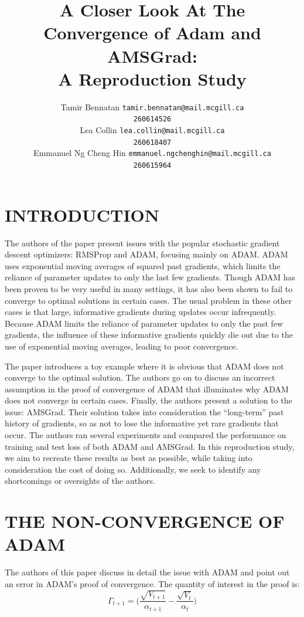\documentclass[letterpaper, 10 pt, conference]{ieeeconf}  %
\title{\LARGE \bf
A Closer Look At The Convergence of Adam and AMSGrad:\\A Reproduction Study
}
\author{ 
	\parbox{2 in}{\centering Tamir Bennatan
         {\tt\small tamir.bennatan@mail.mcgill.ca\\}
         {\tt\small 260614526}}
         \hspace*{ 0.3 in}
         \parbox{2 in}{\centering Lea Collin
         {\tt\small lea.collin@mail.mcgill.ca\\}
         {\tt\small 260618407}}
         \hspace*{0.3 in}
         \parbox{2 in}{\centering Emmanuel Ng Cheng Hin
         {\tt\small emmanuel.ngchenghin@mail.mcgill.ca\\}
         {\tt\small 260615964}}
}
\begin{document}
\maketitle
\thispagestyle{empty}
\pagestyle{empty}



\section{INTRODUCTION}

	The authors of the paper present issues with the popular stochastic gradient descent optimizers: RMSProp and ADAM, focusing mainly on ADAM. ADAM uses exponential moving averages of squared past gradients, which limits the reliance of parameter updates to only the last few gradients. Though ADAM has been proven to be very useful in many settings, it has also been shown to fail to converge to optimal solutions in certain cases. The usual problem in these other cases is that large, informative gradients during updates occur infrequently. Because ADAM limits the reliance of parameter updates to only the past few gradients, the influence of these informative gradients quickly die out due to the use of exponential moving averages, leading to poor convergence. \par
    The paper introduces a toy example where it is obvious that ADAM does not converge to the optimal solution. The authors go on to discuss an incorrect assumption in the proof of convergence of ADAM that illuminates why ADAM does not converge in certain cases. Finally, the authors present a solution to the issue: AMSGrad. Their solution takes into consideration the ``long-term'' past history of gradients, so as not to lose the informative yet rare gradients that occur. The authors ran several experiments and compared the performance on training and test loss of both ADAM and AMSGrad. In this reproduction study, we aim to recreate these results as best as possible, while taking into consideration the cost of doing so. Additionally, we seek to identify any shortcomings or oversights of the authors. 
     
\section{THE NON-CONVERGENCE OF ADAM}
The authors of this paper discuss in detail the issue with ADAM and point out an error in ADAM's proof of convergence. The quantity of interest in the proof is:
$$
	\Gamma_{t+1} = \Bigg(\frac{\sqrt{V_{t+1}}}{\alpha_{t+1}} - \frac{\sqrt{V_{t}}}{\alpha_{t}} \Bigg) 
$$
\end{document}
